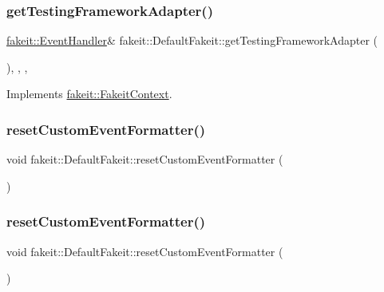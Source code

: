 \subsubsection{\texorpdfstring{getTestingFrameworkAdapter()}{getTestingFrameworkAdapter()}\hspace{0.1cm}{\footnotesize\ttfamily [9/9]}}
{\footnotesize\ttfamily \mbox{\hyperlink{structfakeit_1_1EventHandler}{fakeit\+::\+Event\+Handler}}\& fakeit\+::\+Default\+Fakeit\+::get\+Testing\+Framework\+Adapter (\begin{DoxyParamCaption}{ }\end{DoxyParamCaption})\hspace{0.3cm}{\ttfamily [inline]}, {\ttfamily [override]}, {\ttfamily [protected]}, {\ttfamily [virtual]}}



Implements \mbox{\hyperlink{structfakeit_1_1FakeitContext_a4be017ccd6c80cdafc02bd1985f183c8}{fakeit\+::\+Fakeit\+Context}}.

\mbox{\label{classfakeit_1_1DefaultFakeit_a1fe3c5a8670686b732765e6ea1e15b3b}} 
\subsubsection{\texorpdfstring{resetCustomEventFormatter()}{resetCustomEventFormatter()}\hspace{0.1cm}{\footnotesize\ttfamily [1/9]}}
{\footnotesize\ttfamily void fakeit\+::\+Default\+Fakeit\+::reset\+Custom\+Event\+Formatter (\begin{DoxyParamCaption}{ }\end{DoxyParamCaption})\hspace{0.3cm}{\ttfamily [inline]}}

\mbox{\label{classfakeit_1_1DefaultFakeit_a1fe3c5a8670686b732765e6ea1e15b3b}} 
\subsubsection{\texorpdfstring{resetCustomEventFormatter()}{resetCustomEventFormatter()}\hspace{0.1cm}{\footnotesize\ttfamily [2/9]}}
{\footnotesize\ttfamily void fakeit\+::\+Default\+Fakeit\+::reset\+Custom\+Event\+Formatter (\begin{DoxyParamCaption}{ }\end{DoxyParamCaption})\hspace{0.3cm}{\ttfamily [inline]}}

